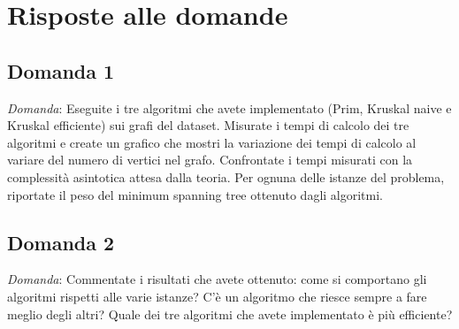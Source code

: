 \section{Risposte alle domande}

\subsection{Domanda 1}

\textit{Domanda}: Eseguite i tre algoritmi che avete implementato (Prim, Kruskal naive e
Kruskal efficiente) sui grafi del dataset. Misurate i tempi di calcolo dei tre algoritmi e
create un grafico che mostri la variazione dei tempi di calcolo al variare del numero di
vertici nel grafo. Confrontate i tempi misurati con la complessità asintotica attesa dalla
teoria. Per ognuna delle istanze del problema, riportate il peso del minimum spanning tree
ottenuto dagli algoritmi.

\subsection{Domanda 2}
\textit{Domanda}: Commentate i risultati che avete ottenuto: come si comportano gli
algoritmi rispetti alle varie istanze? C'è un algoritmo che riesce sempre a fare meglio
degli altri? Quale dei tre algoritmi che avete implementato è più efficiente? 